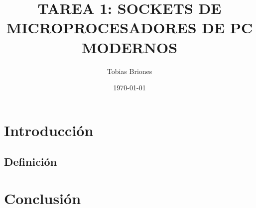 \documentclass{article}
\title{TAREA 1: SOCKETS DE MICROPROCESADORES DE PC MODERNOS}
\author{Tobias Briones}
\date{\today}
\begin{document}
\maketitle

\newpage


\section{Introducción}


\subsection{Definición}


\section{Conclusión}

\printbibliography
\end{document}
